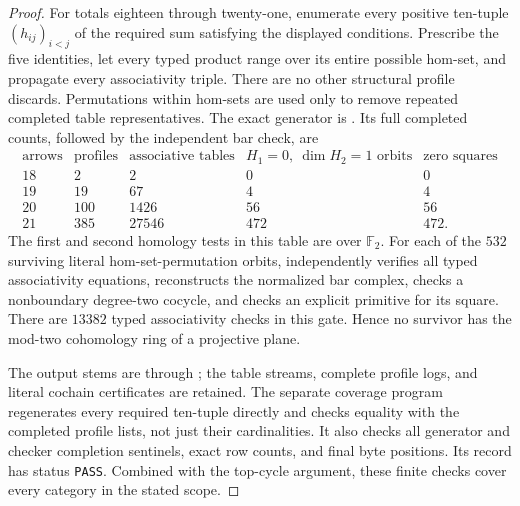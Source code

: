 \begin{proof}
For totals eighteen through twenty-one, enumerate every positive
ten-tuple $(h_{ij})_{i<j}$ of the required sum satisfying the
displayed conditions.  Prescribe the five identities, let every
typed product range over its entire possible hom-set, and
propagate every associativity triple.  There are no other
structural profile discards.  Permutations within hom-sets
are used only to remove repeated completed table representatives.
The exact generator is
.  Its full completed
counts, followed by the independent bar check, are
\[
\begin{array}{c|r|r|r|r}
\text{arrows}&\text{profiles}&\text{associative tables}
 &H_1=0,\ \dim H_2=1\text{ orbits}&\text{zero squares}\\\hline
18&2&2&0&0\\
19&19&67&4&4\\
20&100&1426&56&56\\
21&385&27546&472&472.
\end{array}
\]
The first and second homology tests in this table are over
$\mathbb F_2$.  For each of the $532$ surviving literal
hom-set-permutation orbits,
 independently verifies all
typed associativity equations, reconstructs the normalized
bar complex, checks a nonboundary degree-two cocycle, and
checks an explicit primitive for its square.  There are
$13382$ typed associativity checks in this gate.  Hence no
survivor has the mod-two cohomology ring of a projective plane.

The output stems are  through
; the table streams, complete
profile logs, and literal cochain certificates are retained.
The separate coverage program
 regenerates every required
ten-tuple directly and checks equality with the completed
profile lists, not just their cardinalities.  It also checks
all generator and checker completion sentinels, exact row
counts, and final byte positions.  Its record
 has status
\texttt{PASS}.  Combined with the top-cycle argument, these
finite checks cover every category in the stated scope.
\end{proof}
